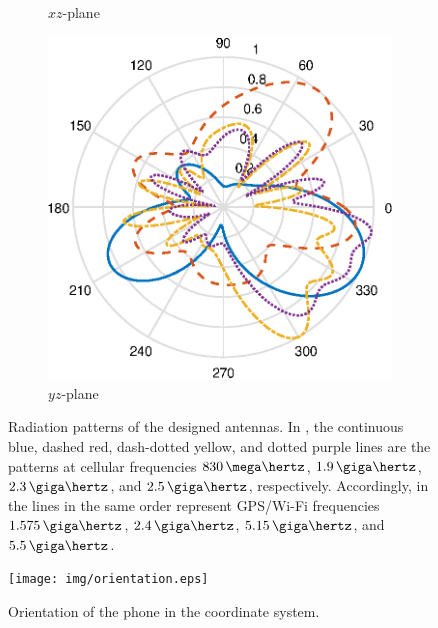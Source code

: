 \begin{figure}[H]
\begin{subfigure}[b]{0.26\textwidth}
        \caption{$xz$-plane}
        \label{fig:ff_xz_gpswifi}
    \end{subfigure}
    \begin{subfigure}[b]{0.26\textwidth}
        \includegraphics[width=\textwidth]{img/ff_gpswifi_yz.eps}
        \caption{$yz$-plane}
        \label{fig:ff_yz_gpswifi}
    \end{subfigure}
    \vspace{-5pt}
    \caption{Radiation patterns of the designed antennas. In , the continuous blue, dashed red, dash-dotted yellow, and dotted purple lines are the patterns at cellular frequencies $830\,\mega\hertz$, $1.9\,\giga\hertz$, $2.3\,\giga\hertz$, and $2.5\,\giga\hertz$, respectively. Accordingly, in  the lines in the same order represent GPS/Wi-Fi frequencies $1.575\,\giga\hertz$, $2.4\,\giga\hertz$, $5.15\,\giga\hertz$, and $5.5\,\giga\hertz$. }
    \label{fig:rad_patterns}
    \vspace{-10pt}
\end{figure}

\begin{figure}[H]
    \centering
    \texttt{[image: img/orientation.eps]}
    \caption{Orientation of the phone in the coordinate system.}
    \label{fig:orientation}
\end{figure}

